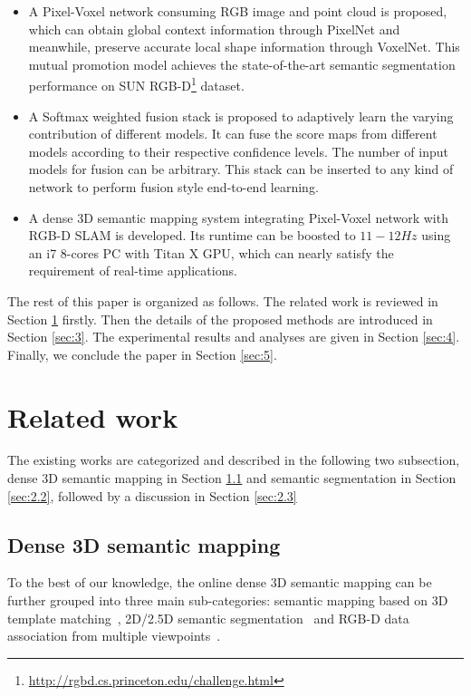 \documentclass[letterpaper, 10 pt, conference]{ieeeconf}
\begin{document}
\begin{itemize}

\item A Pixel-Voxel network consuming RGB image and point cloud is proposed, which can obtain global context information through PixelNet and meanwhile, preserve accurate local shape information through VoxelNet. This mutual promotion model achieves the state-of-the-art semantic segmentation performance on SUN RGB-D\footnote{\url{http://rgbd.cs.princeton.edu/challenge.html}} dataset.    

\item A Softmax weighted fusion stack is proposed to adaptively learn the varying contribution of different models. It can fuse the score maps from different models according to their respective confidence levels. The number of input models for fusion can be arbitrary. This stack can be inserted to any kind of network to perform fusion style end-to-end learning.

\item A dense 3D semantic mapping system integrating Pixel-Voxel network with RGB-D SLAM is developed. Its runtime can be boosted to $11-12Hz$ using an i7 8-cores PC with Titan X GPU, which can nearly satisfy the requirement of real-time applications.

\end{itemize}

The rest of this paper is organized as follows. The related work is reviewed in Section \ref{sec:2} firstly. Then the details of the proposed methods are introduced in Section \ref{sec:3}. The experimental results and analyses are given in Section \ref{sec:4}. Finally, we conclude the paper in Section \ref{sec:5}.

\section{Related work}\label{sec:2}
The existing works are categorized and described in the following two subsection, dense 3D semantic mapping in Section \ref{sec:2.1} and semantic segmentation in Section \ref{sec:2.2}, followed by a discussion in Section \ref{sec:2.3}

\subsection{Dense 3D semantic mapping}\label{sec:2.1}
To the best of our knowledge, the online dense 3D semantic mapping can be further grouped into three main sub-categories: semantic mapping based on 3D template matching~\cite{salas2013slam++}\cite{tateno20162}, 2D/2.5D semantic segmentation~\cite{hermans2014dense}\cite{vineet2015incremental}\cite{mccormac2017semanticfusion}\cite{tateno2017cnn}\cite{zhao2017fully} and RGB-D data association from multiple viewpoints~\cite{xiang2017rnn}\cite{ma2017multi}\cite{mustafa2017semantically}.  
\end{document}
